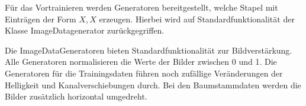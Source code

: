 	Für das Vortrainieren werden Generatoren bereitgestellt, welche Stapel mit Einträgen der Form $X ,X$ erzeugen. Hierbei wird auf Standardfunktionalität der Klasse ImageDatagenerator zurückgegriffen.
	
	Die ImageDataGeneratoren bieten Standardfunktionalität zur Bildverstärkung. Alle Generatoren normalisieren die Werte der Bilder zwischen 0 und 1. Die Generatoren für die Trainingsdaten führen noch zufällige Veränderungen der Helligkeit und Kanalverschiebungen durch. Bei den Baumstammdaten werden die Bilder zusätzlich horizontal umgedreht. 


 


 
